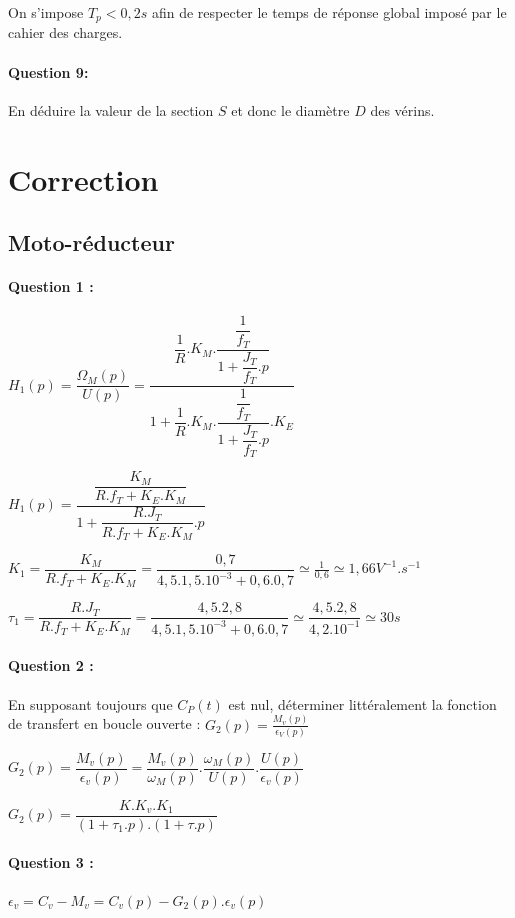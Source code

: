 On s'impose $T_p<0,2s$ afin de respecter le temps de réponse global imposé par le cahier des charges.

\paragraph{Question 9:} En déduire la valeur de la section $S$ et donc le diamètre $D$ des vérins.

\ifdef{\public}{}{}

\newpage

\pagestyle{correction}

\section{Correction}

\subsection{Moto-réducteur}

\paragraph{Question 1 :} $H_1(p)=\dfrac{\Omega_M(p)}{U(p)}=\dfrac{\dfrac{1}{R}.K_M.\dfrac{\dfrac{1}{f_T}}{1+\dfrac{J_T}{f_T}.p}}{1+\dfrac{1}{R}.K_M.\dfrac{\dfrac{1}{f_T}}{1+\dfrac{J_T}{f_T}.p}.K_E}$

$H_1(p)=\dfrac{\dfrac{K_M}{R.f_T+K_E.K_M}}{1+\dfrac{R.J_T}{R.f_T+K_E.K_M}.p}$

$K_1=\dfrac{K_M}{R.f_T+K_E.K_M}=\dfrac{0,7}{4,5.1,5.10^{-3}+0,6.0,7}\simeq\frac{1}{0,6}\simeq1,66V^{-1}.s^{-1}$

$\tau_1=\dfrac{R.J_T}{R.f_T+K_E.K_M}=\dfrac{4,5.2,8}{4,5.1,5.10^{-3}+0,6.0,7}\simeq\dfrac{4,5.2,8}{4,2.10^{-1}}\simeq30s$

\paragraph{Question 2 :} En supposant toujours que $C_P(t)$ est nul, déterminer littéralement la fonction de transfert en boucle ouverte : $G_2(p)=\frac{M_v(p)}{\epsilon_V(p)}$	

$G_2(p)=\dfrac{M_v(p)}{\epsilon_v(p)}=\dfrac{M_v(p)}{\omega_M(p)}.\dfrac{\omega_M(p)}{U(p)}.\dfrac{U(p)}{\epsilon_v(p)}$

$G_2(p)=\dfrac{K.K_v.K_1}{(1+\tau_1.p).(1+\tau.p)}$

\paragraph{Question 3 :} $\epsilon_v=C_v-M_v=C_v(p)-G_2(p).\epsilon_v(p)$

